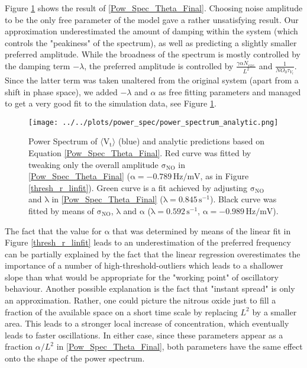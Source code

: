 \documentclass[10pt,a4paper]{article}
\begin{document}
Figure \ref{Pow_Spec_Theta_vs_Analytic} shows the result of \eqref{Pow_Spec_Theta_Final}. Choosing noise amplitude to be the only free parameter of the model gave a rather unsatisfying result. Our approximation underestimated the amount of damping within the system (which controls the "peakiness" of the spectrum), as well as predicting a slightly smaller preferred amplitude. While the broadness of the spectrum is mostly controlled by the damping term $-\lambda$, the preferred amplitude is controlled by $\frac{\gamma \alpha N_{exc.}}{L^2}$ and $\frac{1}{NO_0\tau_{V_t}}$. Since the latter term was taken unaltered from the original system (apart from a shift in phase space), we added $-\lambda$ and $\alpha$ as free fitting parameters and managed to get a very good fit to the simulation data, see Figure \ref{Pow_Spec_Theta_vs_Analytic}.   
\begin{figure}
\begin{center}
\texttt{[image: ../../plots/power\_spec/power\_spectrum\_analytic.png]}
\end{center}
\caption{Power Spectrum of $\mathrm{\langle V_t \rangle}$ (blue) and analytic predictions based on Equation \eqref{Pow_Spec_Theta_Final}. Red curve was fitted by tweaking only the overall amplitude $\mathrm{\sigma_{NO}}$ in \eqref{Pow_Spec_Theta_Final} ($\mathrm{\alpha = -0.789 \,Hz/mV}$, as in Figure \ref{thresh_r_linfit}). Green curve is a fit achieved by adjusting $\mathrm{\sigma_{NO}}$ and $\mathrm{\lambda}$ in \eqref{Pow_Spec_Theta_Final} ($\mathrm{\lambda = 0.845 \,s^{-1}}$). Black curve was fitted by means of $\mathrm{\sigma_{NO}}$, $\mathrm{\lambda}$ and $\mathrm{\alpha}$ ($\mathrm{\lambda = 0.592 \,s^{-1}}$, $\mathrm{\alpha=-0.989 \,Hz/mV}$).}
\label{Pow_Spec_Theta_vs_Analytic}
\end{figure}
The fact that the value for $\mathrm{\alpha}$ that was determined by means of the linear fit in Figure \ref{thresh_r_linfit} leads to an underestimation of the preferred frequency can be partially explained by the fact that the linear regression overestimates the importance of a number of high-threshold-outliers which leads to a shallower slope than what would be appropriate for the "working point" of oscillatory behaviour. Another possible explanation is the fact that "instant spread" is only an approximation. Rather, one could picture the nitrous oxide just to fill a fraction of the available space on a short time scale by replacing $L^2$ by a smaller area. This leads to a stronger local increase of concentration, which eventually leads to faster oscillations. In either case, since these parameters appear as a fraction $\alpha/L^2$ in \eqref{Pow_Spec_Theta_Final}, both parameters have the same effect onto the shape of the power spectrum.
\end{document}
